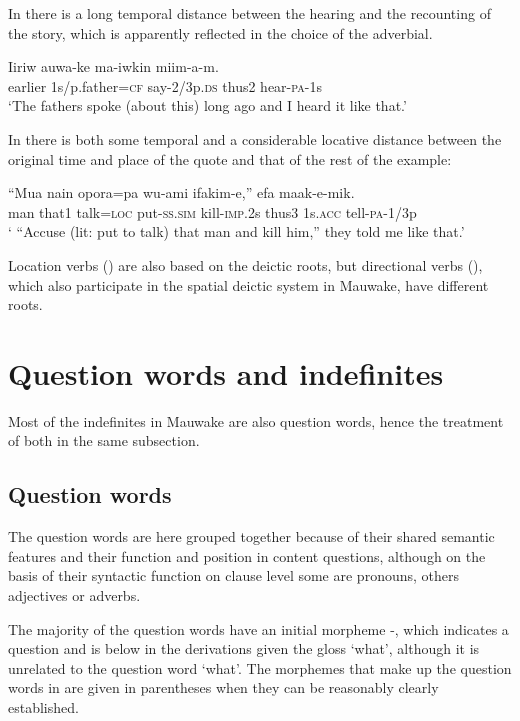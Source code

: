 In  there is a long temporal distance between the hearing and the recounting of the story, which is apparently reflected in the choice of the adverbial.

\ea%
\label{ex:3:x1857}
\gll Iiriw auwa-ke ma-iwkin  miim-a-m. \\
earlier 1s/p.father=\textsc{cf} say-2/3p.\textsc{ds} thus2 hear-\textsc{pa}-1s\\
\glt`The fathers spoke (about this) long ago and I heard it like that.'
\z

In  there is both some temporal and a considerable locative distance between the original time and place of the quote and that of the rest of the example: 

\ea%
\label{ex:3:x1858}
\gll ``Mua nain opora=pa wu-ami ifakim-e,''  efa maak-e-mik.\\
man that1 talk=\textsc{loc} put-\textsc{ss}.\textsc{sim} kill-\textsc{imp}.2s thus3 1s.\textsc{acc} tell-\textsc{pa}-1/3p\\
\glt` ``Accuse (lit: put to talk) that man and kill him,'' they told me like that.'
\z

Location verbs () are also based on the deictic roots, but directional verbs (), which also participate in the spatial deictic system in Mauwake, have different roots. 

\section{Question words and indefinites}\label{sec:3:7}
{}
Most of the indefinites in Mauwake are also question words, hence the treatment of both in the same subsection.

\subsection{Question words}\label{sec:3.7.1}
{}
The question words are here grouped together because of their shared semantic features and their function and position in content questions, although on the basis of their syntactic function on clause level some are pronouns, others adjectives or adverbs. 

The majority of the question words have an initial morpheme -, which indicates a question and is below in the derivations given the gloss `what', although it is unrelated to the question word  `what'. The morphemes that make up the question words in  are given in parentheses when they can be reasonably clearly established. 


